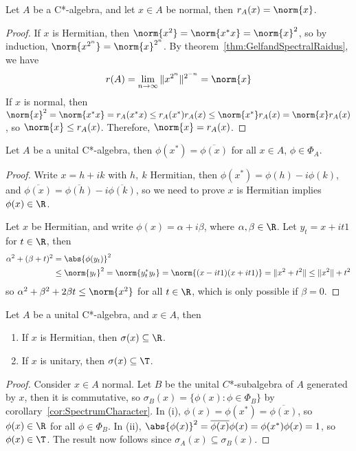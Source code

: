 \documentclass[a4paper]{article}
\begin{document}
\begin{nlemma}\label{lem:C*SpectralRadius}
  Let $A$ be a C*-algebra, and let $x\in A$ be normal, then $r_A(x)=\norm{x}$.
\end{nlemma}

\begin{proof}
	If $x$ is Hermitian, then $\norm{x^2}=\norm{x^*x}=\norm{x}^2$, so by induction, $\norm{x^{2^n}}=\norm{x}^{2^n}$. By theorem~\ref{thm:GelfandSpectralRaidus}, we have
	\[r(A)=\lim_{n\to\infty}\|x^{2^n}\|^{2^{-n}}=\norm{x}\]
	If $x$ is normal, then $\norm{x}^2=\norm{x^*x}=r_A(x^*x)\leq r_A(x^*)r_A(x)\leq\norm{x^*}r_A(x)=\norm{x}r_A(x)$, so $\norm{x}\leq r_A(x)$. Therefore, $\norm{x}=r_A(x)$.
\end{proof}

\begin{nlemma}\label{lem:C*morphism}
Let $A$ be a unital C*-algebra, then $\phi(x^*)=\overline{\phi(x)}$ for all $x\in A$, $\phi\in\Phi_A$.
\end{nlemma}

\begin{proof}
  Write $x=h+ik$ with $h,\ k$ Hermitian, then $\phi(x^*)=\phi(h)-i\phi(k)$, and $\overline{\phi(x)}=\overline{\phi(h)}-i\overline{\phi(k)}$, so we need to prove $x$ is Hermitian implies $\phi(x)\in\R$.

  Let $x$ be Hermitian, and write $\phi(x)=\alpha+i\beta$, where $\alpha,\beta\in\R$. Let $y_t=x+it1$ for $t\in\R$, then
  \begin{align*}
    \alpha^2+(\beta+t)^2&=\abs{\phi(y_t)}^2\\
    &\leq\norm{y_t}^2=\norm{y_t^*y_t} =\norm{(x-it1)(x+it1)}=\|x^2+t^2\|\leq\|x^2\|+t^2
  \end{align*}
  so $\alpha^2+\beta^2+2\beta t\leq\norm{x^2}$ for all $t\in\R$, which is only possible if $\beta=0$.
\end{proof}

\begin{ncor}
	Let $A$ be a unital C*-algebra, and $x\in A$, then
	\begin{enumerate}[label=(\roman*)]
		\item If $x$ is Hermitian, then $\sigma(x)\subseteq\R$.
		\item If $x$ is unitary, then $\sigma(x)\subseteq\T$.
	\end{enumerate}
\end{ncor}

\begin{proof}
	Consider $x\in A$ normal. Let $B$ be the unital $C$*-subalgebra of $A$ generated by $x$, then it is commutative, so $\sigma_B(x)=\{\phi(x):\phi\in\Phi_B\}$ by corollary~\ref{cor:SpectrumCharacter}. In (i), $\phi(x)=\phi(x^*)=\overline{\phi(x)}$, so $\phi(x)\in\R$ for all $\phi\in\Phi_B$. In (ii), $\abs{\phi(x)}^2=\overline{\phi(x)}\phi(x)=\phi(x^*)\phi(x)=1$, so $\phi(x)\in\T$. The result now follows since $\sigma_A(x)\subseteq\sigma_B(x)$.
\end{proof}
\end{document}
